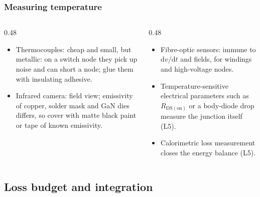 \begin{frame}
	\frametitle{Measuring temperature}
	\begin{columns}[T]
		\begin{column}{0.48\textwidth}
			\small
			\begin{itemize}
				\item Thermocouples: cheap and small, but metallic: on a switch node they pick up noise and can short a node; glue them with insulating adhesive.
				\item Infrared camera: field view; emissivity of copper, solder mask and GaN dies differs, so cover with matte black paint or tape of known emissivity.
			\end{itemize}
		\end{column}
		\begin{column}{0.48\textwidth}
			\small
			\begin{itemize}
				\item Fibre-optic sensors: immune to $\mathrm{d}v/\mathrm{d}t$ and fields, for windings and high-voltage nodes.
				\item Temperature-sensitive electrical parameters such as $R_\mathrm{DS(on)}$ or a body-diode drop measure the junction itself (L5).
				\item Calorimetric loss measurement closes the energy balance (L5).
			\end{itemize}
		\end{column}
	\end{columns}
\end{frame}

\subsection{Loss budget and integration}

